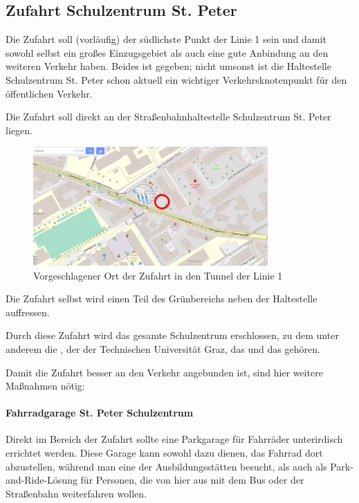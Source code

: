 \subsection{Zufahrt Schulzentrum St. Peter}
Die Zufahrt  soll (vorläufig) der südlichste Punkt der Linie 1 sein und damit sowohl selbst ein großes Einzugsgebiet als auch eine gute Anbindung an den weiteren Verkehr haben. Beides ist gegeben; nicht umsonst ist die Haltestelle Schulzentrum St. Peter schon aktuell ein wichtiger Verkehrsknotenpunkt für den öffentlichen Verkehr.

Die Zufahrt soll direkt an der Straßenbahnhaltestelle Schulzentrum St. Peter liegen.

\begin{figure}
    \includegraphics[width=0.8\textwidth]{main/bike/tunnel/uni/zufahrt_inffeld}
    \centering
    \caption[Zufhart St. Peter Schulzentrum]{Vorgeschlagener Ort der Zufahrt in den Tunnel der Linie 1}
\end{figure}

Die Zufahrt selbst wird einen Teil des Grünbereichs neben der Haltestelle auffressen.

Durch diese Zufahrt wird das gesamte Schulzentrum erschlossen, zu dem unter anderem die , der  der Technischen Universität Graz, das  und das  gehören.

Damit die Zufahrt besser an den Verkehr angebunden ist, sind hier weitere Maßnahmen nötig:

\paragraph{Fahrradgarage St. Peter Schulzentrum}
Direkt im Bereich der Zufahrt sollte eine Parkgarage für Fahrräder unterirdisch errichtet werden. Diese Garage kann sowohl dazu dienen, das Fahrrad dort abzustellen, während man eine der Ausbildungsstätten besucht, als auch als Park-and-Ride-Lösung für Personen, die von hier aus mit dem Bus oder der Straßenbahn weiterfahren wollen.

